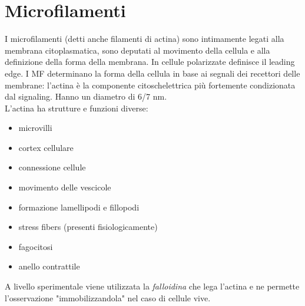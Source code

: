 \section{Microfilamenti}
    I microfilamenti (detti anche filamenti di actina) sono intimamente legati alla membrana citoplasmatica, sono deputati al movimento della cellula e alla definizione della forma della membrana. In cellule polarizzate definisce il leading edge. I MF determinano la forma della cellula in base ai segnali dei recettori delle membrane: l'actina è la componente citoschelettrica più fortemente condizionata dal signaling. Hanno un diametro di 6/7 nm.\\
    L'actina ha strutture e funzioni diverse:
        \begin{itemize}
            \item microvilli
            \item cortex cellulare
            \item connessione cellule
            \item movimento delle vescicole
            \item formazione lamellipodi e fillopodi
            \item stress fibers (presenti fisiologicamente)
            \item fagocitosi
            \item anello contrattile
        \end{itemize}
    A livello sperimentale viene utilizzata la \textit{falloidina} che lega l'actina e ne permette l'osservazione "immobilizzandola" nel caso di cellule vive.
    

